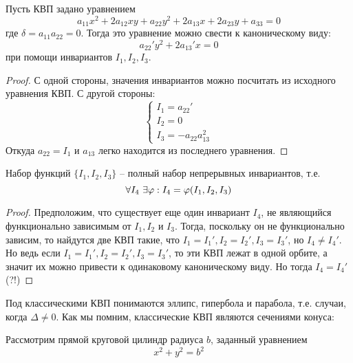 \begin{Thm}
	Пусть КВП задано уравнением
	\[a_{11} x^2 + 2a_{12}xy + a_{22}y^2 + 2a_{13}x + 2a_{23}y + a_{33} = 0\]
	где $\delta = a_{11} a_{22} = 0$. Тогда это уравнение можно свести к каноническому виду:
	\[a_{22}' y^2 + 2 a_{13}' x = 0\]
	при помощи инвариантов $I_1, I_2, I_3$.
\end{Thm}

\begin{proof}
	С одной стороны, значения инвариантов можно посчитать из исходного уравнения КВП. С другой стороны:
	\[\begin{cases}
		I_1 = a_{22}' \\
		I_2 = 0 \\
		I_3 = -a_{22} a_{13}^2
	\end{cases}\]
	Откуда $a_{22} = I_1$ и $a_{13}$ легко находится из последнего уравнения. 
\end{proof}

\begin{Prop}
	Набор функций $\{I_1, I_2, I_3\}$ -- полный набор непрерывных инвариантов, т.е.
	\[\forall I_4 \ \exists \varphi : I_4 = \varphi(I_1, I_2, I_3)\]
\end{Prop}

\begin{proof}
	Предположим, что существует еще один инвариант $I_4$, не являющийся функционально зависимым от $I_1, I_2$ и $I_3$.
	Тогда, поскольку он не функционально зависим, то найдутся две КВП такие, что $I_1 = I_1', I_2 = I_2', I_3 = I_3'$, но $I_4 \neq I_4'$.
	Но ведь если $I_1 = I_1', I_2 = I_2', I_3 = I_3'$, то эти КВП лежат в одной орбите, а значит их можно привести к одинаковому каноническому виду.
	Но тогда $I_4 = I_4'$ (?!)
\end{proof}


Под классическими КВП понимаются эллипс, гипербола и парабола, т.е. случаи, когда $\Delta \neq 0$.
Как мы помним, классические КВП являются сечениями конуса:

\begin{figure}[H]
	\centering
	\def\svgwidth{.3\columnwidth}
	
\end{figure}

Рассмотрим прямой круговой цилиндр радиуса $b$, заданный уравнением
\[x^2 + y^2 = b^2\] 

\begin{figure}[h]
	\centering
	\def\svgwidth{.8\columnwidth}
	
\end{figure}

